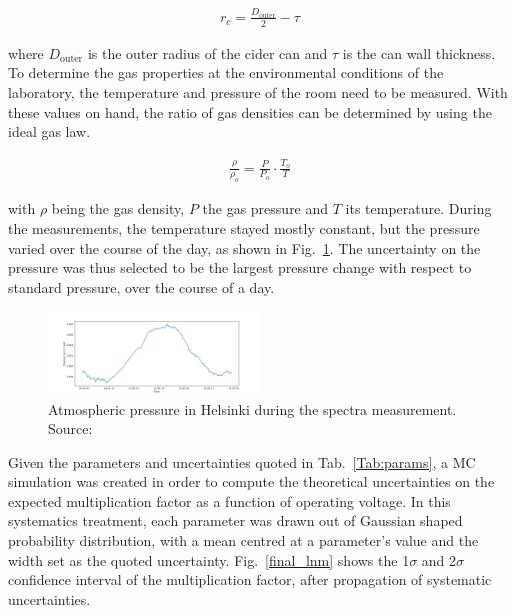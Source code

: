 \begin{align}
  \label{eq:rcra}
  r_{c} = \frac{D_\mathrm{outer}}{2}-\tau
\end{align}

where $D_\mathrm{outer}$ is the outer radius of the cider can and $\tau$ is the can wall thickness.
To determine the gas properties at the environmental conditions of the laboratory, the temperature and pressure of the room need to be measured. With these values on hand, the ratio of gas densities can be determined by using the ideal gas law.

\begin{align}
  \label{eq:gaslaw}
  \frac{\rho}{\rho_{o}} = \frac{P}{P_{o}}\cdot \frac{T_{o}}{T}
\end{align}

with $\rho$ being the gas density, $P$ the gas pressure and $T$ its temperature.
During the measurements, the temperature stayed mostly constant, but the pressure varied over the course of the day, as shown in Fig.~\ref{fig:pressure}. The uncertainty on the pressure was thus selected to be the largest pressure change with respect to standard pressure, over the course of a day.

\begin{figure}[htb]
  \includegraphics[width=0.5\textwidth]{graphics/pressure_monitoring.png}
  \caption{Atmospheric pressure in Helsinki during the spectra measurement. Source: \cite{meteo}}
  \label{fig:pressure}
\end{figure}

Given the parameters and uncertainties quoted in Tab.~\ref{Tab:params}, a MC simulation was created in order to compute the theoretical uncertainties on the expected multiplication factor as a function of operating voltage. In this systematics treatment, each parameter was drawn out of Gaussian shaped probability distribution, with a mean centred at a parameter's value and the width set as the quoted uncertainty. Fig.~\ref{final_lnm} shows the 1$\sigma$ and 2$\sigma$ confidence interval of the multiplication factor, after propagation of systematic uncertainties.



